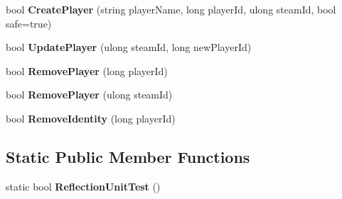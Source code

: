 \begin{DoxyCompactItemize}
\item 
\hypertarget{class_s_e_mod_a_p_i_internal_1_1_a_p_i_1_1_common_1_1_player_map_ad5cc91cb0ae1b9c3e942a4679781ee0f}{}bool {\bfseries Create\+Player} (string player\+Name, long player\+Id, ulong steam\+Id, bool safe=true)\label{class_s_e_mod_a_p_i_internal_1_1_a_p_i_1_1_common_1_1_player_map_ad5cc91cb0ae1b9c3e942a4679781ee0f}

\item 
\hypertarget{class_s_e_mod_a_p_i_internal_1_1_a_p_i_1_1_common_1_1_player_map_ab43f86a46f965be54d07fdf7df54dae9}{}bool {\bfseries Update\+Player} (ulong steam\+Id, long new\+Player\+Id)\label{class_s_e_mod_a_p_i_internal_1_1_a_p_i_1_1_common_1_1_player_map_ab43f86a46f965be54d07fdf7df54dae9}

\item 
\hypertarget{class_s_e_mod_a_p_i_internal_1_1_a_p_i_1_1_common_1_1_player_map_aab9d864c13b7d5598c04ac8ae28ec1b4}{}bool {\bfseries Remove\+Player} (long player\+Id)\label{class_s_e_mod_a_p_i_internal_1_1_a_p_i_1_1_common_1_1_player_map_aab9d864c13b7d5598c04ac8ae28ec1b4}

\item 
\hypertarget{class_s_e_mod_a_p_i_internal_1_1_a_p_i_1_1_common_1_1_player_map_ac37471c5e410ec6924e46ed801465b1d}{}bool {\bfseries Remove\+Player} (ulong steam\+Id)\label{class_s_e_mod_a_p_i_internal_1_1_a_p_i_1_1_common_1_1_player_map_ac37471c5e410ec6924e46ed801465b1d}

\item 
\hypertarget{class_s_e_mod_a_p_i_internal_1_1_a_p_i_1_1_common_1_1_player_map_a8a9e4e64df1798981128f05204d9058b}{}bool {\bfseries Remove\+Identity} (long player\+Id)\label{class_s_e_mod_a_p_i_internal_1_1_a_p_i_1_1_common_1_1_player_map_a8a9e4e64df1798981128f05204d9058b}

\end{DoxyCompactItemize}
\subsection*{Static Public Member Functions}
\begin{DoxyCompactItemize}
\item 
\hypertarget{class_s_e_mod_a_p_i_internal_1_1_a_p_i_1_1_common_1_1_player_map_a9300ca6ae25053c13a63ec6192ad5cc3}{}static bool {\bfseries Reflection\+Unit\+Test} ()\label{class_s_e_mod_a_p_i_internal_1_1_a_p_i_1_1_common_1_1_player_map_a9300ca6ae25053c13a63ec6192ad5cc3}

\end{DoxyCompactItemize}
